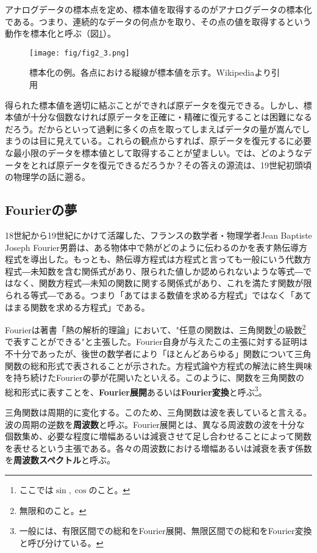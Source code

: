 アナログデータの標本点を定め、標本値を取得するのがアナログデータの標本化である。つまり、連続的なデータの何点かを取り、その点の値を取得するという動作を標本化と呼ぶ（図\ref{fig2_3}）。

\begin{figure}[htbp]
\centering
\texttt{[image: fig/fig2\_3.png]}
\caption{標本化の例。各点における縦線が標本値を示す。Wikipediaより引用}\label{fig2_3}
\end{figure}

得られた標本値を適切に結ぶことができれば原データを復元できる。しかし、標本値が十分な個数なければ原データを正確に・精確に復元することは困難になるだろう。だからといって過剰に多くの点を取ってしまえばデータの量が嵩んでしまうのは目に見えている。これらの観点からすれば、原データを復元するに必要な最小限のデータを標本値として取得することが望ましい。では、どのようなデータをとれば原データを復元できるだろうか？その答えの源流は、19世紀初頭頃の物理学の話に遡る。

\subsection{Fourierの夢}

18世紀から19世紀にかけて活躍した、フランスの数学者・物理学者Jean Baptiste Joseph Fourier男爵は、ある物体中で熱がどのように伝わるのかを表す熱伝導方程式を導出した。もっとも、熱伝導方程式は方程式と言っても一般にいう代数方程式―未知数を含む関係式があり、限られた値しか認められないような等式―ではなく、関数方程式―未知の関数に関する関係式があり、これを満たす関数が限られる等式―である。つまり「あてはまる数値を求める方程式」ではなく「あてはまる関数を求める方程式」である。

Fourierは著書「熱の解析的理論」において、"任意の関数は、三角関数\footnote{ここでは$\sin,\cos$のこと。}の級数\footnote{無限和のこと。}で表すことができる"と主張した。Fourier自身が与えたこの主張に対する証明は不十分であったが、後世の数学者により「ほとんどあらゆる」関数について三角関数の総和形式で表されることが示された。方程式論や方程式の解法に終生興味を持ち続けたFourierの夢が花開いたといえる。このように、関数を三角関数の総和形式に表すことを、\textbf{Fourier展開}あるいは\textbf{Fourier変換}と呼ぶ\footnote{一般には、有限区間での総和をFourier展開、無限区間での総和をFourier変換と呼び分けている。}。

三角関数は周期的に変化する。このため、三角関数は波を表していると言える。波の周期の逆数を\textbf{周波数}と呼ぶ。Fourier展開とは、異なる周波数の波を十分な個数集め、必要な程度に増幅あるいは減衰させて足し合わせることによって関数を表せるという主張である。各々の周波数における増幅あるいは減衰を表す係数を\textbf{周波数スペクトル}と呼ぶ。


